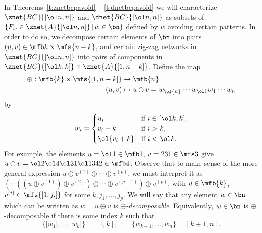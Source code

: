 In Theorems~\ref{t:znetbcpavoid} -- \ref{t:dnetbcpavoid}
we will characterize
$\znet{BC}{[\ol n,n]}$ and $\dnet{BC}{[\ol n,n]}$
as subsets of $\{ F_w \in \znet{A}{[\ol n,n]} \,|\, w \in \bn \}$
defined by $w$ avoiding certain patterns.
In order to do so, we
decompose certain
elements of $\bn$ into pairs $(u,v) \in \mfb k \times \mfs{n-k}$,
and certain
zig-zag networks in $\znet{BC}{[\ol n,n]}$
into pairs of components in $\znet{BC}{[\ol k,k]} \times \znet{A}{[1,n-k]}$.
Define the map
\begin{equation}\label{eq:oplusperm}
  \begin{aligned}
    \oplus: \mfb{k} \times \mfs{[1,n-k]} &\rightarrow \mfb{n}\\
    (u,v) &\mapsto u \oplus v = w_{\ol{n}} \cdots w_{\ol1} w_1 \cdots w_n
  \end{aligned}
\end{equation}
by 
\begin{equation*}
  w_i = \begin{cases}
    u_i &\text{if $i \in [\ol k, k]$},\\
    v_i + k &\text{if $i > k$},\\
    \ol{v_i + k} &\text{if $i < \ol k$}.
  \end{cases}
\end{equation*}
For example,
the elements
$u = \ol 1 \in \mfb1$, $v = 231 \in \mfs3$ give
$u \oplus v  =\ol2\ol4\ol3 1 \ol1 342 \in \mfb4$.
Observe that to make sense of the more general expression
$u \oplus v^{(1)} \oplus \cdots \oplus v^{(p)}$,
we must interpret it as
$( \cdots ((u \oplus v^{(1)}) \oplus v^{(2)}) \oplus \cdots \oplus v^{(p-1)}) \oplus v^{(p)}$, with $u \in \mfb{k}$, $v^{(i)} \in \mfs{[1,j_i]}$
for some $k, j_1, \dotsc, j_p$.
We will say that any element $w \in \bn$ which can be written as
$w = u \oplus v$ is {\em $\oplus$-decomposable}.
Equivalently, $w \in \bn$ is $\oplus$-decomposable if there is
some index $k$ such that
\begin{equation*}
  \{|w_1|, \dotsc, |w_k| \} = [1,k], \qquad \{w_{k+1}, \dotsc, w_n\} = [k+1,n].
\end{equation*}

